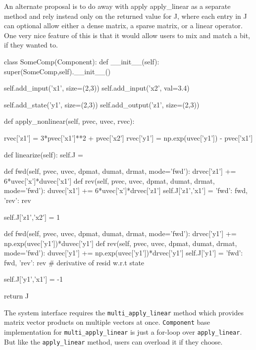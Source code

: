 \documentclass[12pt]{article}
\newcommand{\classname}[1]{\texttt{#1}}
\newcommand{\method}[1]{\texttt{#1}}
\begin{document}
An alternate proposal is to do away with apply apply_linear as a separate method and
rely instead only on the returned value for J, where each entry in J can optional
allow either a dense matrix, a sparse matrix, or a linear operator. One very nice feature
of this is that it would allow users to mix and match a bit, if they wanted to.

\begin{pyglist}[language=python]
    class SomeComp(Component):
        def __init__(self):
            super(SomeComp,self).__init__()

            self.add_input('x1', size=(2,3))
            self.add_input('x2', val=3.4)

            self.add_state('y1', size=(2,3))
            self.add_output('z1', size=(2,3))

        def apply_nonlinear(self, pvec, uvec, rvec):

            rvec['z1'] = 3*pvec['x1']**2 + pvec['x2']
            rvec['y1'] = np.exp(uvec['y1']) - pvec['x1']

        def linearize(self):
            self.J = {}


            def fwd(self, pvec, uvec, dpmat, dumat, drmat, mode='fwd'):
                drvec['z1'] += 6*uvec['x']*duvec['x1']
            def rev(self, pvec, uvec, dpmat, dumat, drmat, mode='fwd'):
                duvec['x1'] += 6*uvec['x']*drvec['z1']
            self.J['z1','x1'] = {'fwd': fwd, 'rev': rev}

            self.J['z1','x2'] = 1

            def fwd(self, pvec, uvec, dpmat, dumat, drmat, mode='fwd'):
                drvec['y1'] += np.exp(uvec['y1'])*duvec['y1']
            def rev(self, pvec, uvec, dpmat, dumat, drmat, mode='fwd'):
                duvec['y1'] += np.exp(uvec['y1'])*drvec['y1']
            self.J['y1'] = {'fwd': fwd, 'rev': rev} # derivative of resid w.r.t state

            self.J['y1','x1'] = -1

            return J

\end{pyglist}

The system interface requires the \method{multi\_apply\_linear}  method which provides matrix
vector products on multiple vectors at once. \classname{Component} base implementation
for \method{multi\_apply\_linear} is just a for-loop over \method{apply\_linear}. But like
the \method{apply\_linear} method, users can overload it if they choose.
\end{document}
